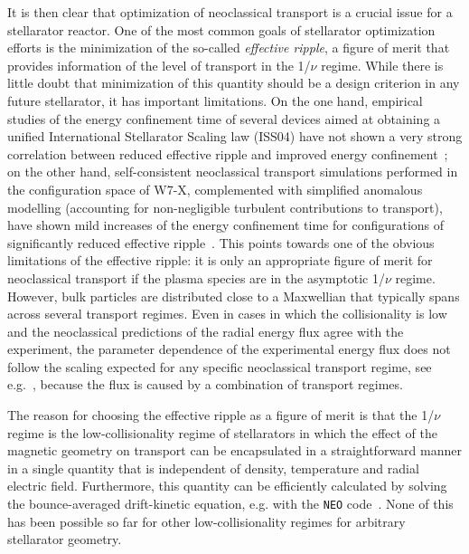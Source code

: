 It is then clear that optimization of neoclassical transport is a crucial issue for a stellarator reactor. One of the most common goals of stellarator optimization efforts is the minimization of the so-called \textit{effective ripple}, a figure of merit that provides information of the level of transport in the 1/$\nu$ regime. While there is little doubt that minimization of this quantity should be a design criterion in any future stellarator, it has important limitations. On the one hand, empirical studies of the energy confinement time of several devices aimed at obtaining a unified International Stellarator Scaling law (ISS04) have not shown a very strong correlation between reduced effective ripple and improved energy confinement~\citep{yamada2005taue,fuchert2018taue}; on the other hand, self-consistent neoclassical transport simulations performed in the configuration space of W7-X, complemented with simplified anomalous modelling (accounting for non-negligible turbulent contributions to transport), have shown mild increases of the energy confinement time for configurations of significantly reduced effective ripple~\citep{geiger2014w7x}. This points towards one of the obvious limitations of the effective ripple: it is only an appropriate figure of merit for neoclassical transport if the plasma species are in the asymptotic 1/$\nu$ regime. However, bulk particles are distributed close to a Maxwellian that typically spans across several transport regimes. Even in cases in which the collisionality is low and the neoclassical predictions of the radial energy flux agree with the experiment, the parameter dependence of the experimental energy flux does not follow the scaling expected for any specific neoclassical transport regime, see e.g.~\citep{alonso2017eps}, because the flux is caused by a combination of transport regimes.
 
The reason for choosing the effective ripple as a figure of merit is that the 1/$\nu$ regime is the low-collisionality regime of stellarators in which the effect of the magnetic geometry on transport can be encapsulated in a straightforward manner in a single quantity that is independent of density, temperature and radial electric field. Furthermore, this quantity can be efficiently calculated by solving the bounce-averaged drift-kinetic equation, e.g. with the \texttt{NEO} code~\citep{nemov1999neo}. None of this has been possible so far for other low-collisionality regimes for arbitrary stellarator geometry.

